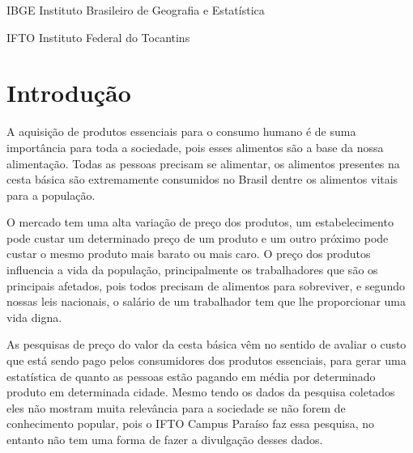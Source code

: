 \documentclass{ifto-tex}
\begin{document}
\listoftables*
\cleardoublepage

\begin{siglas}
	\item[IBGE]{Instituto Brasileiro de Geografia e Estatística}
	\item[IFTO]{Instituto Federal do Tocantins}
\end{siglas}


\tableofcontents*
\cleardoublepage


\textual

\chapter{Introdução}
A aquisição de produtos essenciais para o consumo humano é de suma importância para toda a sociedade, pois esses alimentos são a base da nossa alimentação. Todas as pessoas precisam se alimentar, os alimentos presentes na cesta básica são extremamente consumidos no Brasil dentre os alimentos vitais para a população.

O mercado tem uma alta variação de preço dos produtos, um estabelecimento pode custar um determinado preço de um produto e um outro próximo pode custar o mesmo produto mais barato ou mais caro. O preço dos produtos influencia a vida da população, principalmente os trabalhadores que são os principais afetados, pois todos precisam de alimentos para sobreviver, e segundo nossas leis nacionais, o salário de um trabalhador tem que lhe proporcionar uma vida digna.

As pesquisas de preço do valor da cesta básica vêm no sentido de avaliar o custo que está sendo pago pelos consumidores dos produtos essenciais, para gerar uma estatística de quanto as pessoas estão pagando em média por determinado produto em determinada cidade. Mesmo tendo os dados da pesquisa coletados eles não mostram muita relevância para a sociedade se não forem de conhecimento popular, pois o IFTO Campus Paraíso faz essa pesquisa, no entanto não tem uma forma de fazer a divulgação desses dados.
\end{document}
